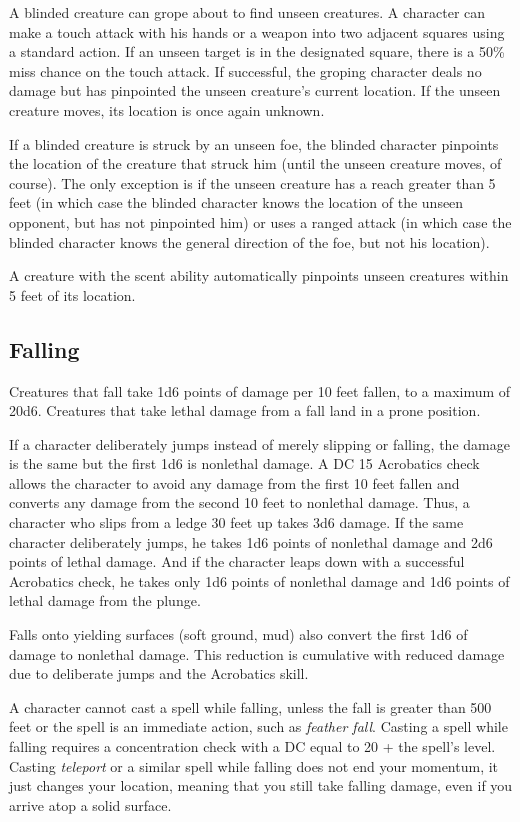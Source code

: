 A blinded creature can grope about to find unseen creatures. A character can make a touch attack with his hands or a weapon into two adjacent squares using a standard action. If an unseen target is in the designated square, there is a 50\% miss chance on the touch attack. If successful, the groping character deals no damage but has pinpointed the unseen creature's current location. If the unseen creature moves, its location is once again unknown.
				
If a blinded creature is struck by an unseen foe, the blinded character pinpoints the location of the creature that struck him (until the unseen creature moves, of course). The only exception is if the unseen creature has a reach greater than 5 feet (in which case the blinded character knows the location of the unseen opponent, but has not pinpointed him) or uses a ranged attack (in which case the blinded character knows the general direction of the foe, but not his location).
				
A creature with the scent ability automatically pinpoints unseen creatures within 5 feet of its location.
				
\subsection{Falling}

				
Creatures that fall take 1d6 points of damage per 10 feet fallen, to a maximum of 20d6. Creatures that take lethal damage from a fall land in a prone position.
				
If a character deliberately jumps instead of merely slipping or falling, the damage is the same but the first 1d6 is nonlethal damage. A DC 15 Acrobatics check allows the character to avoid any damage from the first 10 feet fallen and converts any damage from the second 10 feet to nonlethal damage. Thus, a character who slips from a ledge 30 feet up takes 3d6 damage. If the same character deliberately jumps, he takes 1d6 points of nonlethal damage and 2d6 points of lethal damage. And if the character leaps down with a successful Acrobatics check, he takes only 1d6 points of nonlethal damage and 1d6 points of lethal damage from the plunge. 
				
Falls onto yielding surfaces (soft ground, mud) also convert the first 1d6 of damage to nonlethal damage. This reduction is cumulative with reduced damage due to deliberate jumps and the Acrobatics skill.
				
A character cannot cast a spell while falling, unless the fall is greater than 500 feet or the spell is an immediate action, such as \textit{feather fall}. Casting a spell while falling requires a concentration check with a DC equal to 20 + the spell's level. Casting \textit{teleport} or a similar spell while falling does not end your momentum, it just changes your location, meaning that you still take falling damage, even if you arrive atop a solid surface.
				
